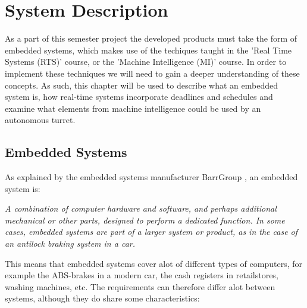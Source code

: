 \chapter{System Description}
As a part of this semester project the developed products must take the form of
embedded systems, which makes use of the techiques taught in the 'Real Time
Systems (RTS)' course, or the 'Machine Intelligence (MI)' course. In order to
implement these techniques we will need to gain a deeper understanding of these
concepts. As such, this chapter will be used to describe what an embedded system
is, how real-time systems incorporate deadlines and schedules and examine what
elements from machine intelligence could be used by an autonomous turret.

\section{Embedded Systems}
As explained by the embedded systems manufacturer BarrGroup
\citep{Barr_Embedded}, an embedded system is: \nl

\begin{center}
\begin{minipage}{0.8\linewidth}
\textit{A combination of computer hardware and software, and perhaps additional
mechanical or other parts, designed to perform a dedicated function. In some
cases, embedded systems are part of a larger system or product, as in the case
of an antilock braking system in a car.}
\end{minipage}
\end{center}
% 

This means that embedded systems cover alot of different types of computers, for example
the ABS-brakes in a modern car, the cash registers in retailstores, washing machines, etc.
The requirements can therefore differ alot between systems, although they do
share some characteristics\citep[ch.1.1]{vahid1999embedded}:

